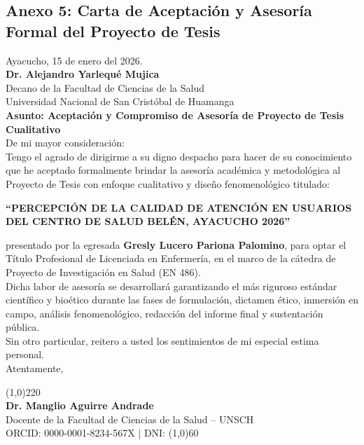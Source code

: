 \vspace{0.5cm}

\subsection*{Anexo 5: Carta de Aceptación y Asesoría Formal del Proyecto de Tesis}
\label{anx:5_carta}

\noindent Ayacucho, 15 de enero del 2026.\\[0.3cm]
\textbf{Dr. Alejandro Yarlequé Mujica}\\
Decano de la Facultad de Ciencias de la Salud\\
Universidad Nacional de San Cristóbal de Huamanga\\[0.3cm]
\textbf{Asunto: Aceptación y Compromiso de Asesoría de Proyecto de Tesis Cualitativo}\\[0.3cm]
De mi mayor consideración:\\[0.2cm]
Tengo el agrado de dirigirme a su digno despacho para hacer de su conocimiento que he aceptado formalmente brindar la asesoría académica y metodológica al Proyecto de Tesis con enfoque cualitativo y diseño fenomenológico titulado:
\begin{center}
\textbf{``PERCEPCIÓN DE LA CALIDAD DE ATENCIÓN EN USUARIOS DEL CENTRO DE SALUD BELÉN, AYACUCHO 2026''}
\end{center}
presentado por la egresada \textbf{Gresly Lucero Pariona Palomino}, para optar el Título Profesional de Licenciada en Enfermería, en el marco de la cátedra de Proyecto de Investigación en Salud (EN 486).\\[0.2cm]
Dicha labor de asesoría se desarrollará garantizando el más riguroso estándar científico y bioético durante las fases de formulación, dictamen ético, inmersión en campo, análisis fenomenológico, redacción del informe final y sustentación pública.\\[0.2cm]
Sin otro particular, reitero a usted los sentimientos de mi especial estima personal.\\[0.3cm]
Atentamente,\\[1.2cm]
\begin{center}
    \line(1,0){220}\\
    \textbf{Dr. Manglio Aguirre Andrade}\\
    Docente de la Facultad de Ciencias de la Salud -- UNSCH\\
    ORCID: 0000-0001-8234-567X \quad | \quad DNI: \line(1,0){60}
\end{center}
